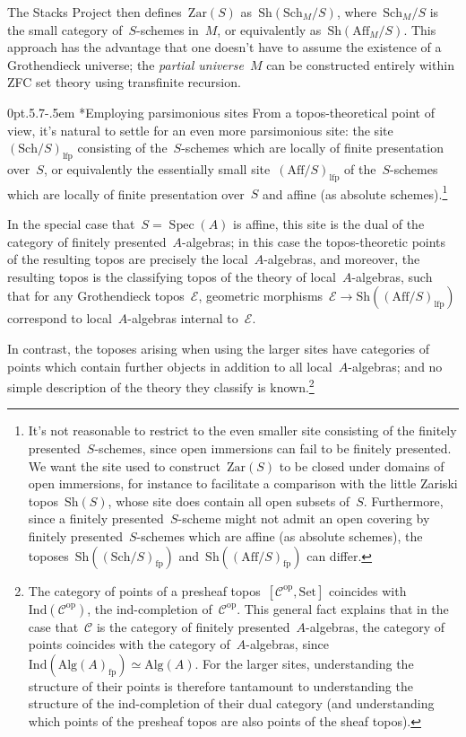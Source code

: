 \documentclass[10pt,reqno,a4paper]{amsbook}
\makeatletter
\theoremstyle{definition}
\theoremstyle{plain}
\theoremstyle{remark}
\renewcommand{\C}{\mathcal{C}}
\newcommand{\E}{\mathcal{E}}
\newcommand{\Ind}{\mathrm{Ind}}
\newcommand{\Set}{\mathrm{Set}}
\newcommand{\Sh}{\mathrm{Sh}}
\newcommand{\Zar}{\mathrm{Zar}}
\newcommand{\Sch}{\mathrm{Sch}}
\newcommand{\Aff}{\mathrm{Aff}}
\newcommand{\Alg}{\mathrm{Alg}}
\newcommand{\lfp}{\mathrm{lfp}}
\newcommand{\fp}{\mathrm{fp}}
\DeclareMathOperator{\Spec}{Spec}
\newcommand{\op}{\mathrm{op}}
\newcommand{\?}{\,{:}\,}
\renewcommand{\_}{\mathpunct{.}\,}
\def\subsection{\@startsection{subsection}{2}%
  {0pt}{.5\linespacing\@plus.7\linespacing}{-.5em}%
  {\normalfont\bfseries}}
\makeatother
\begin{document}
{The Stacks Project then defines~$\Zar(S)$ as~$\Sh(\Sch_M/S)$, where~$\Sch_M/S$
is the small category of~$S$-schemes in~$M$, or equivalently
as~$\Sh(\Aff_M/S)$. This approach has the advantage that one doesn't have to
assume the existence of a Grothendieck universe; the \emph{partial
universe}~$M$ can be constructed entirely within ZFC set theory using
transfinite recursion.

\subsection*{Employing parsimonious sites}
From a topos-theoretical point of view, it's natural to settle for an even
more parsimonious site: the site~$(\Sch/S)_\lfp$ consisting of the~$S$-schemes
which are locally of finite presentation over~$S$, or equivalently the
essentially small site~$(\Aff/S)_\lfp$ of the~$S$-schemes which are locally of
finite presentation over~$S$ and affine (as absolute schemes).\footnote{It's
not reasonable to restrict to the even smaller site consisting of the finitely
presented~$S$-schemes, since open immersions can fail to be finitely presented.
We want the site used to construct~$\Zar(S)$ to be closed under domains of open immersions,
for instance to facilitate a comparison with the little
Zariski topos~$\Sh(S)$, whose site does contain all open subsets of~$S$.
Furthermore, since a finitely presented~$S$-scheme might not admit an open
covering by finitely presented~$S$-schemes which are affine (as absolute
schemes), the toposes~$\Sh((\Sch/S)_\fp)$ and~$\Sh((\Aff/S)_\fp)$ can differ.}

In the special case that~$S = \Spec(A)$ is affine, this site is the
dual of the category of finitely presented~$A$-algebras; in this case the
topos-theoretic points of the resulting topos are precisely the local~$A$-algebras,
and moreover, the resulting topos is the classifying topos of the theory of
local~$A$-algebras, such that for any Grothendieck topos~$\E$, geometric
morphisms~$\E \to \Sh((\Aff/S)_\lfp)$ correspond to local~$A$-algebras internal
to~$\E$.

In contrast, the toposes arising when using the larger sites have categories of
points which contain further objects in addition to all local~$A$-algebras; and
no simple description of the theory they classify is known.\footnote{The
category of points of a presheaf topos~$[\C^\op,\Set]$ coincides
with~$\Ind(\C^\op)$, the ind-completion of~$\C^\op$. This general fact explains that
in the case that~$\C$ is the category of finitely presented~$A$-algebras,
the category of points coincides with the category of~$A$-algebras,
since~$\Ind(\Alg(A)_\fp) \simeq \Alg(A)$. For the larger sites, understanding
the structure of their points is therefore tantamount to understanding the
structure of the ind-completion of their dual category (and understanding which
points of the presheaf topos are also points of the sheaf topos).}

}
\end{document}
